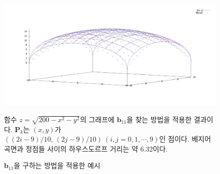 \documentclass{gshs_thesis}
\theoremstyle{theorem}
\theoremstyle{lemma}
\theoremstyle{definition}
\begin{document}
\begin{figure}[h] \label{sphere_approximation}
	\begin{center}
		\includegraphics[width=\textwidth]{image/leastSquare}
	\end{center} 
	\caption{$\mathbf{b}_{11}$을 구하는 방법을 적용한 예시}
	\raggedright \small 함수 $z = \sqrt{200 - x^2 - y^2}$의 그래프에 $\mathbf{b}_{11}$을 찾는 방법을 적용한 결과이다. $\mathbf{P}_k$는 $(x, y)$가 $((2i-9)/10, \, (2j-9)/10) \ (i, j = 0, 1, \cdots, 9)$인 점이다. 베지어 곡면과 정점들 사이의 하우스도르프 거리는 약 6.32이다. 
\end{figure}
\end{document}
